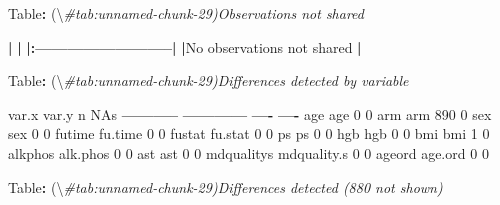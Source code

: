 \documentclass[
]{book}
\newenvironment{Shaded}{\begin{snugshade}}{\end{snugshade}}
\newcommand{\CommentTok}[1]{\textcolor[rgb]{0.56,0.35,0.01}{\textit{#1}}}
\newcommand{\DecValTok}[1]{\textcolor[rgb]{0.00,0.00,0.81}{#1}}
\newcommand{\ErrorTok}[1]{\textcolor[rgb]{0.64,0.00,0.00}{\textbf{#1}}}
\newcommand{\NormalTok}[1]{#1}
\newcommand{\OperatorTok}[1]{\textcolor[rgb]{0.81,0.36,0.00}{\textbf{#1}}}
\newcommand{\StringTok}[1]{\textcolor[rgb]{0.31,0.60,0.02}{#1}}
\begin{document}
\begin{Shaded}
\begin{Highlighting}[]
\NormalTok{Table}\OperatorTok{:}\StringTok{ }\NormalTok{(\textbackslash{}}\CommentTok{#tab:unnamed-chunk-29)Observations not shared}

\OperatorTok{|}\StringTok{                           }\ErrorTok{|}
\ErrorTok{|:}\OperatorTok{--------------------------}\ErrorTok{|}
\ErrorTok{|}\NormalTok{No observations not shared }\OperatorTok{|}



\NormalTok{Table}\OperatorTok{:}\StringTok{ }\NormalTok{(\textbackslash{}}\CommentTok{#tab:unnamed-chunk-29)Differences detected by variable}

\NormalTok{var.x        var.y            n   NAs}
\OperatorTok{-----------}\StringTok{  }\OperatorTok{------------}\StringTok{  }\OperatorTok{----}\StringTok{  }\OperatorTok{----}
\NormalTok{age          age              }\DecValTok{0}     \DecValTok{0}
\NormalTok{arm          arm            }\DecValTok{890}     \DecValTok{0}
\NormalTok{sex          sex              }\DecValTok{0}     \DecValTok{0}
\NormalTok{futime       fu.time          }\DecValTok{0}     \DecValTok{0}
\NormalTok{fustat       fu.stat          }\DecValTok{0}     \DecValTok{0}
\NormalTok{ps           ps               }\DecValTok{0}     \DecValTok{0}
\NormalTok{hgb          hgb              }\DecValTok{0}     \DecValTok{0}
\NormalTok{bmi          bmi              }\DecValTok{1}     \DecValTok{0}
\NormalTok{alkphos      alk.phos         }\DecValTok{0}     \DecValTok{0}
\NormalTok{ast          ast              }\DecValTok{0}     \DecValTok{0}
\NormalTok{mdqualitys   mdquality.s      }\DecValTok{0}     \DecValTok{0}
\NormalTok{ageord       age.ord          }\DecValTok{0}     \DecValTok{0}



\NormalTok{Table}\OperatorTok{:}\StringTok{ }\NormalTok{(\textbackslash{}}\CommentTok{#tab:unnamed-chunk-29)Differences detected (880 not shown)}


\end{Highlighting}
\end{Shaded}
\end{document}
